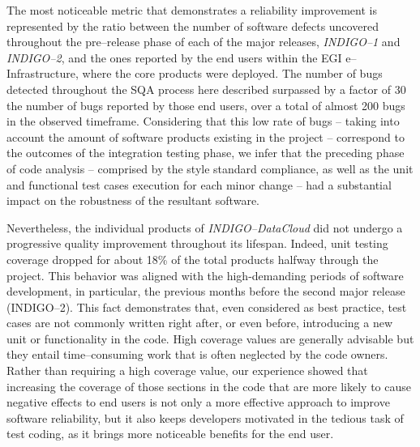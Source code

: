 The most noticeable metric that demonstrates a reliability improvement is represented 
by the ratio between the number of software defects uncovered throughout the pre--release
phase of each of the major releases, {\sl INDIGO--1} and {\sl INDIGO--2}, and the ones 
reported by the end users within the EGI e--Infrastructure, where the core products were 
deployed. The number of bugs detected throughout the SQA process here described 
surpassed by a factor of 30 the number of bugs reported by those end users, over a total
of almost 200 bugs in the observed timeframe. Considering that this low rate of bugs -- 
taking into account the amount of software products existing in the project -- 
correspond to the outcomes of the integration testing phase, we infer that the preceding
phase of code analysis -- comprised by the style standard compliance, as well as the unit and
functional test cases execution for each minor change -- had a substantial impact on the robustness
of the resultant software.

Nevertheless, the individual products of {\sl INDIGO--DataCloud} did not undergo 
a progressive quality improvement throughout its lifespan. Indeed,
unit testing coverage dropped for about 18\% of the total products halfway through
the project. This behavior was aligned with the high-demanding periods of software
development, in particular, the previous months before the second major release 
(INDIGO--2). This fact demonstrates that, even considered as best practice, test 
cases are not commonly written right after, or even before, introducing a new unit
or functionality in the code. High coverage values are generally advisable but they
entail time--consuming work that is often neglected by the code owners. Rather than
requiring a high coverage value, our experience showed that increasing the coverage
of those sections in the code that are more likely to cause negative effects to end
users is not only a more effective approach to improve software reliability, but it 
also keeps developers motivated in the tedious task of test coding, as it brings more 
noticeable benefits for the end user.


